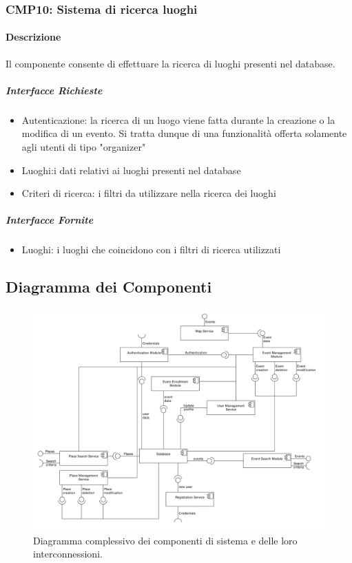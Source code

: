 \documentclass[9pt]{extarticle}
\begin{document}
\subsubsection*{CMP10: Sistema di ricerca luoghi}
\paragraph{Descrizione}
Il componente consente di effettuare la ricerca di luoghi presenti nel database.
\subparagraph{Interfacce Richieste}
\begin{itemize}
	\item Autenticazione: la ricerca di un luogo viene fatta durante la creazione o la modifica di un evento. Si tratta dunque di una funzionalità offerta solamente agli utenti di tipo "organizer"
	\item Luoghi:i dati relativi ai luoghi presenti nel database
	\item Criteri di ricerca: i filtri da utilizzare nella ricerca dei luoghi
\end{itemize}
\subparagraph{Interfacce Fornite}
\begin{itemize}
	\item Luoghi: i luoghi che coincidono con i filtri di ricerca utilizzati
\end{itemize}


\subsection{Diagramma dei Componenti}

\begin{figure}[!htb]
	\centering
	\includegraphics[width=\linewidth]{./images/ComponentDiagram.pdf}
	\caption{Diagramma complessivo dei componenti di sistema e delle loro interconnessioni.}
	\label{fig:ComponentDiagram}
\end{figure}
\end{document}
